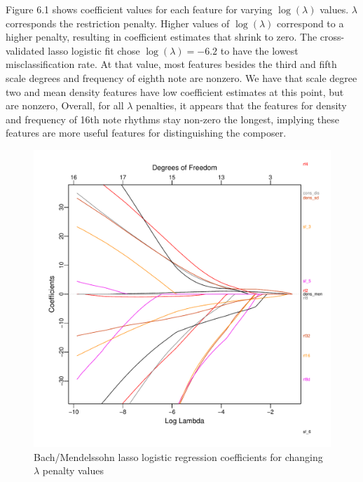 \documentclass[12pt,twoside]{reedthesis}
\theoremstyle{definition}
\theoremstyle{definition}
\theoremstyle{definition}
\theoremstyle{remark}
\begin{document}
Figure 6.1 shows coefficient values for each feature for varying
\(\log(\lambda)\) values. \(\lambda\) corresponds the restriction
penalty. Higher values of \(\log(\lambda)\) correspond to a higher
penalty, resulting in coefficient estimates that shrink to zero. The
cross-validated lasso logistic fit chose \(\log(\lambda) = -6.2\) to
have the lowest misclassification rate. At that value, most features
besides the third and fifth scale degrees and frequency of eighth note
are nonzero. We have that scale degree two and mean density features
have low coefficient estimates at this point, but are nonzero, Overall,
for all \(\lambda\) penalties, it appears that the features for density
and frequency of 16th note rhythms stay non-zero the longest, implying
these features are more useful features for distinguishing the composer.
\begin{figure}[H]
\centering
\includegraphics[scale = .6]{images/lasso_coef_b.pdf}
\caption{Bach/Mendelssohn lasso logistic regression coefficients for changing $\lambda$ penalty values}
\label{subd}
\end{figure}
\end{document}
